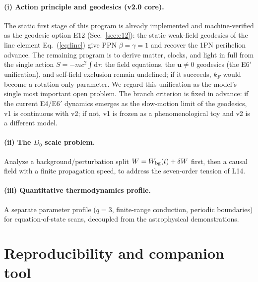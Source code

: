 \documentclass[aps,reprint,amsmath,amssymb,nofootinbib,superscriptaddress,floatfix]{revtex4-2}
\newcommand{\ud}{\mathrm{d}}
\newcommand{\vect}[1]{\bm{#1}}
\newcommand{\Dz}{D_0}
\begin{document}
\paragraph*{(i) Action principle and geodesics (v2.0 core).}
The static first stage of this program is already implemented and
machine-verified as the geodesic option E12 (Sec.~\ref{sec:e12}): the
static weak-field geodesics of the line element Eq.~(\ref{eq:line})
give PPN $\beta = \gamma = 1$ and recover the 1PN perihelion advance.
The remaining program is to derive matter, clocks, and light in full
from the single action $S = -mc^2\!\int\!\ud\tau$: the field
equations, the $\vect{u}\ne0$ geodesics (the E6$'$ unification), and
self-field exclusion remain undefined; if it succeeds, $k_F$ would
become a rotation-only parameter.
We regard this unification as the model's single most important open
problem.
The branch criterion is fixed in advance: if the current E4/E6$'$
dynamics emerges as the slow-motion limit of the geodesics, v1 is
continuous with v2; if not, v1 is frozen as a phenomenological toy
and v2 is a different model.

\paragraph*{(ii) The $\Dz$ scale problem.}
Analyze a background/perturbation split $W = W_{\rm bg}(t) + \delta W$
first, then a causal field with a finite propagation speed, to address
the seven-order tension of L14.

\paragraph*{(iii) Quantitative thermodynamics profile.}
A separate parameter profile ($q = 3$, finite-range conduction,
periodic boundaries) for equation-of-state scans, decoupled from the
astrophysical demonstrations.

\section*{Reproducibility and companion tool}
\label{sec:repro}
\end{document}
